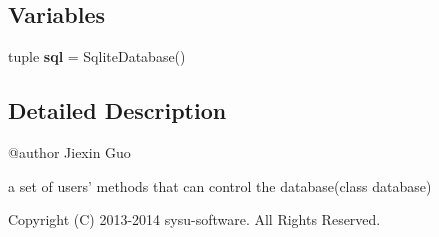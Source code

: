 \subsection*{Variables}
\begin{DoxyCompactItemize}
\item 
\hypertarget{namespaceweb_1_1user_ae4c15c998e969053728966b533ddb61d}{tuple {\bfseries sql} = Sqlite\-Database()}\label{namespaceweb_1_1user_ae4c15c998e969053728966b533ddb61d}

\end{DoxyCompactItemize}


\subsection{Detailed Description}
\begin{DoxyVerb}@author Jiexin Guo

a set of users' methods that can control the database(class database)

Copyright (C) 2013-2014 sysu-software. All Rights Reserved.
\end{DoxyVerb}
 